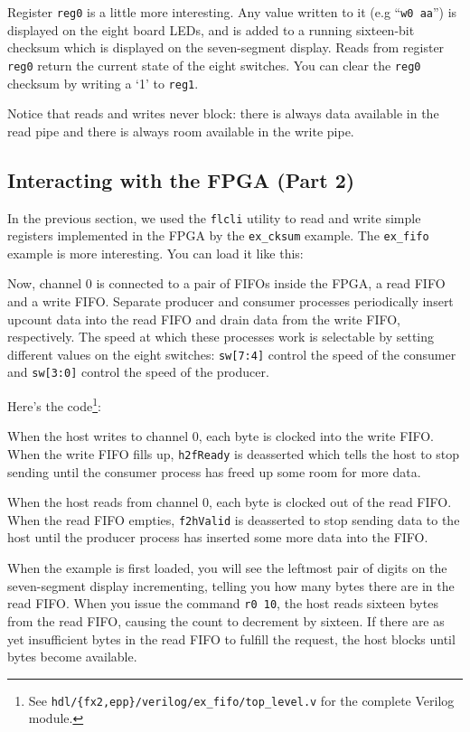 Register \texttt{reg0} is a little more interesting. Any value written to it (e.g ``\texttt{w0 aa}'') is displayed on the eight board LEDs, and is added to a running sixteen-bit checksum which is displayed on the seven-segment display. Reads from register \texttt{reg0} return the current state of the eight switches. You can clear the \texttt{reg0} checksum by writing a `1' to \texttt{reg1}.

Notice that reads and writes never block: there is always data available in the read pipe and there is always room available in the write pipe.

\subsection{Interacting with the FPGA (Part 2)}
In the previous section, we used the \texttt{flcli} utility to read and write simple registers implemented in the FPGA by the \texttt{ex\_cksum} example. The \texttt{ex\_fifo} example is more interesting. You can load it like this:


Now, channel 0 is connected to a pair of FIFOs inside the FPGA, a read FIFO and a write FIFO. Separate producer and consumer processes periodically insert upcount data into the read FIFO and drain data from the write FIFO, respectively. The speed at which these processes work is selectable by setting different values on the eight switches: \texttt{sw[7:4]} control the speed of the consumer and \texttt{sw[3:0]} control the speed of the producer.

Here's the code\footnote{See \texttt{hdl/\{fx2,epp\}/verilog/ex\_fifo/top\_level.v} for the complete Verilog module.}:


When the host writes to channel 0, each byte is clocked into the write FIFO. When the write FIFO fills up, \texttt{h2fReady} is deasserted which tells the host to stop sending until the consumer process has freed up some room for more data.

When the host reads from channel 0, each byte is clocked out of the read FIFO. When the read FIFO empties, \texttt{f2hValid} is deasserted to stop sending data to the host until the producer process has inserted some more data into the FIFO.

When the example is first loaded, you will see the leftmost pair of digits on the seven-segment display incrementing, telling you how many bytes there are in the read FIFO. When you issue the command \texttt{r0 10}, the host reads sixteen bytes from the read FIFO, causing the count to decrement by sixteen. If there are as yet insufficient bytes in the read FIFO to fulfill the request, the host blocks until bytes become available.

